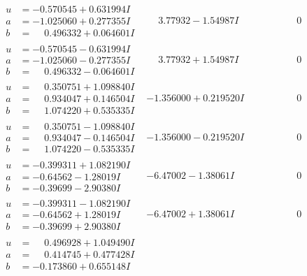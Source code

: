 \documentclass[1p]{elsarticle_modified}
\theoremstyle{definition}
\begin{document}
$$\begin{array}{c|c|c}
\begin{aligned}
u &= -0.570545 + 0.631994 I \\
a &= -1.025060 + 0.277355 I \\
b &= \phantom{-}0.496332 + 0.064601 I\end{aligned}
 & \phantom{-}3.77932 - 1.54987 I & \phantom{-0.000000 } 0 \\ \hline\begin{aligned}
u &= -0.570545 - 0.631994 I \\
a &= -1.025060 - 0.277355 I \\
b &= \phantom{-}0.496332 - 0.064601 I\end{aligned}
 & \phantom{-}3.77932 + 1.54987 I & \phantom{-0.000000 } 0 \\ \hline\begin{aligned}
u &= \phantom{-}0.350751 + 1.098840 I \\
a &= \phantom{-}0.934047 + 0.146504 I \\
b &= \phantom{-}1.074220 + 0.535335 I\end{aligned}
 & -1.356000 + 0.219520 I & \phantom{-0.000000 } 0 \\ \hline\begin{aligned}
u &= \phantom{-}0.350751 - 1.098840 I \\
a &= \phantom{-}0.934047 - 0.146504 I \\
b &= \phantom{-}1.074220 - 0.535335 I\end{aligned}
 & -1.356000 - 0.219520 I & \phantom{-0.000000 } 0 \\ \hline\begin{aligned}
u &= -0.399311 + 1.082190 I \\
a &= -0.64562 - 1.28019 I \\
b &= -0.39699 - 2.90380 I\end{aligned}
 & -6.47002 - 1.38061 I & \phantom{-0.000000 } 0 \\ \hline\begin{aligned}
u &= -0.399311 - 1.082190 I \\
a &= -0.64562 + 1.28019 I \\
b &= -0.39699 + 2.90380 I\end{aligned}
 & -6.47002 + 1.38061 I & \phantom{-0.000000 } 0 \\ \hline\begin{aligned}
u &= \phantom{-}0.496928 + 1.049490 I \\
a &= \phantom{-}0.414745 + 0.477428 I \\
b &= -0.173860 + 0.655148 I\end{aligned}

\end{array}$$
\end{document}
